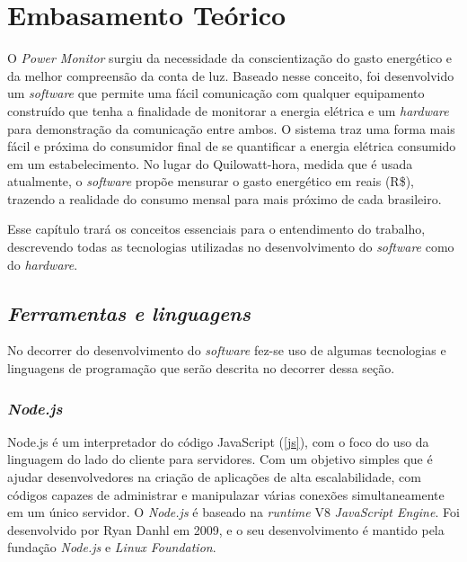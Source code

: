 \chapter[Embasamento Teórico]{Embasamento Teórico}
\label{ch:cap2}
O \textit{Power Monitor} surgiu da necessidade da conscientização do gasto energético e da melhor compreensão da conta de luz. Baseado nesse conceito,
foi desenvolvido um \textit{software} que permite uma fácil comunicação com qualquer equipamento construído que tenha a finalidade de monitorar a energia elétrica e um \textit{hardware} para demonstração
da comunicação entre ambos.
O sistema traz uma forma mais fácil e próxima do consumidor final de se quantificar a energia elétrica consumido em um estabelecimento. No lugar do Quilowatt-hora, medida que é usada atualmente,
o \textit{software} propõe mensurar o gasto energético em reais (R\$), trazendo a realidade do consumo mensal para mais próximo de cada brasileiro.

Esse capítulo trará os conceitos essenciais para o entendimento do trabalho, descrevendo todas as tecnologias utilizadas no desenvolvimento 
do \textit{software} como do \textit{hardware}.

\section[\textit{Ferramentas e linguagens}]{\textit{Ferramentas e linguagens}}\label{ferramenta-linguagem}
No decorrer do desenvolvimento do \textit{software} fez-se uso de algumas tecnologias e linguagens de programação que serão descrita no decorrer
dessa seção.
\subsection[\textit{Node.js}]{\textit{Node.js}}\label{node}
Node.js é um interpretador do código JavaScript (\autoref{js}), com o foco do uso da linguagem do lado do cliente para servidores. Com um objetivo simples
que é ajudar desenvolvedores na criação de aplicações de alta escalabilidade, com códigos capazes de administrar e manipulazar várias conexões simultaneamente
em um único servidor. O \textit{Node.js} é baseado na \textit{runtime} V8 \textit{JavaScript Engine}. Foi desenvolvido por Ryan Danhl em 2009, e o seu desenvolvimento
é mantido pela fundação \textit{Node.js} e \textit{Linux Foundation}. 
